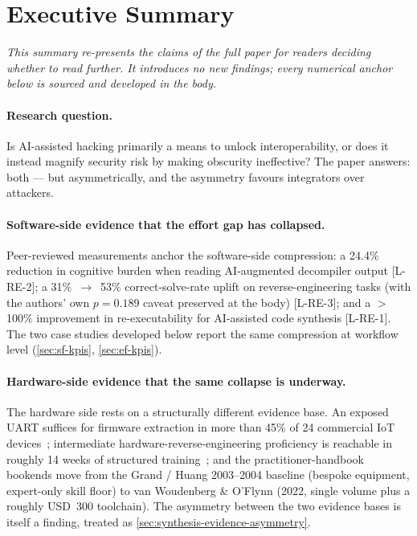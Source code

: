 \documentclass[11pt,a4paper]{article}
\begin{document}
\section*{Executive Summary}
\label{sec:executive-summary}

\noindent\emph{This summary re-presents the claims of the full paper for
readers deciding whether to read further. It introduces no new findings;
every numerical anchor below is sourced and developed in the body.}

\paragraph{Research question.} Is AI-assisted hacking primarily a means to
unlock interoperability, or does it instead magnify security risk by making
obscurity ineffective? The paper answers: both --- but asymmetrically, and
the asymmetry favours integrators over attackers.

\paragraph{Software-side evidence that the effort gap has collapsed.}
Peer-reviewed measurements anchor the software-side compression: a 24.4\%
reduction in cognitive burden when reading AI-augmented decompiler output
[L-RE-2]; a 31\%~$\rightarrow$~53\% correct-solve-rate uplift on
reverse-engineering tasks (with the authors' own $p = 0.189$ caveat
preserved at the body) [L-RE-3]; and a $>$100\% improvement in
re-executability for AI-assisted code synthesis [L-RE-1]. The two case
studies developed below report the same compression at workflow level
(\cref{sec:sf-kpis}, \cref{sec:ef-kpis}).

\paragraph{Hardware-side evidence that the same collapse is underway.}
The hardware side rests on a structurally different evidence base. An
exposed UART suffices for firmware extraction in more than 45\% of 24
commercial IoT devices~\citep{vasile2018breakingallthethings};
intermediate hardware-reverse-engineering proficiency is reachable in
roughly 14 weeks of structured training~\citep{becker2020hwreexploratory};
and the practitioner-handbook bookends move from the Grand / Huang
2003--2004 baseline (bespoke equipment, expert-only skill floor) to van
Woudenberg \& O'Flynn (2022, single volume plus a roughly USD~300
toolchain). The asymmetry between the two evidence bases is itself a
finding, treated as \cref{sec:synthesis-evidence-asymmetry}.
\end{document}
